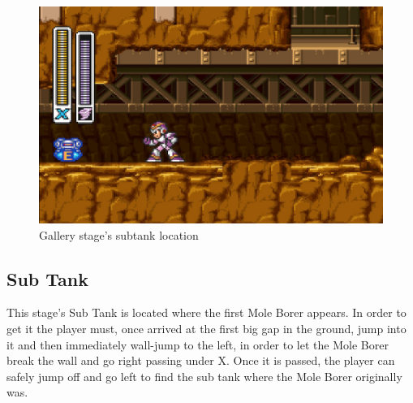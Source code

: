 \begin{figure}[htp]
	\centering
	\includegraphics[width=0.5\linewidth]{figures/X1/Armored_armadillo/Armadillo_tank.jpg}
	\caption{Gallery stage's subtank location}
\end{figure}

\subsection{Sub Tank}
This stage's Sub Tank is located where the first Mole Borer appears. In order to get it the player must, once arrived at the first big gap in the ground, jump into it and then immediately wall-jump to the left, in order to let the Mole Borer break the wall and go right passing under X. Once it is passed, the player can safely jump off and go left to find the sub tank where the Mole Borer originally was. 

